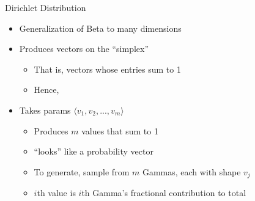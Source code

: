 \documentclass[aspectratio=169]{beamer}
\begin{document}
\begin{frame}{Dirichlet Distribution}
\begin{itemize}
\item Generalization of Beta to many dimensions
\item Produces vectors on the ``simplex''
	\begin{itemize}
	\item That is, vectors whose entries sum to 1
	\item Hence, \color{red}{used as a distribution to produce vectors of probabilities}
	\end{itemize}
\item Takes params $\langle v_1, v_2, ..., v_m \rangle$
	\begin{itemize}
	\item Produces $m$ values that sum to 1
	\item ``looks'' like a probability vector
	\item To generate, sample from $m$ Gammas, each with shape $v_j$
	\item $i$th value is $i$th Gamma's fractional contribution to total
	\end{itemize}
\end{itemize}
\end{frame}
\end{document}
